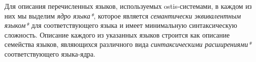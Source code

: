 \begin{SCn}
{Для описания перечисленных языков, используемых ostis-системами, в каждом из них мы выделим \textit{ядро языка*}, которое является \textit{семантически эквивалентным языком*} для соответствующего языка и имеет минимальную синтаксическую сложность. Описание каждого из указанных языков строится как описание семейства языков, являющихся различного вида \textit{синтаксическими расширениями*} соответствующего языка-ядра.
}

\scnendstruct

\end{SCn}







